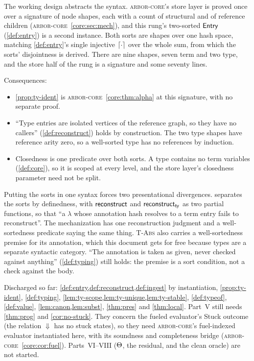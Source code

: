 \documentclass[11pt]{article}
\theoremstyle{definition}
\theoremstyle{plain}
\theoremstyle{remark}
\newcommand{\arborcore}{\textsc{arbor-core}}
\newcommand{\coreref}[1]{\arborcore~\cref{core:#1}}
\begin{document}
The working design abstracts the syntax. \arborcore{}'s store layer is proved once over a
signature of node shapes, each with a count of structural and of reference children
(\coreref{sec:mech}), and this rung's two-sorted $\mathsf{Entry}$ (\cref{def:entry}) is a second
instance. Both sorts are shapes over one hash space, matching \cref{def:entry}'s single
injective $\lceil \cdot \rceil$ over the whole sum, from which the sorts' disjointness is derived.
There are nine shapes, seven term and two type, and the store half of the rung is a signature
and some seventy lines.

Consequences:
\begin{itemize}[nosep]
  \item \cref{prop:ty-ident} is \coreref{thm:alpha} at this signature, with no separate proof.
  \item ``Type entries are isolated vertices of the reference graph, so they have no callers''
  (\cref{def:reconstruct}) holds by construction. The two type shapes have reference arity
  zero, so a well-sorted type has no references by induction.
  \item Closedness is one predicate over both sorts. A type contains no term variables
  (\cref{def:core}), so it is scoped at every level, and the store layer's closedness parameter
  need not be split.
\end{itemize}

Putting the sorts in one syntax forces two presentational divergences.
 separates the sorts by definedness, with $\mathsf{reconstruct}$ and
$\mathsf{reconstruct}_{\mathsf{ty}}$ as two partial functions, so that ``a $\lambda$ whose annotation hash
resolves to a term entry fails to reconstruct''. The mechanization has one reconstruction
judgment and a well-sortedness predicate saying the same thing. \textsc{T-Abs} also carries a
well-sortedness premise for its annotation, which this document gets for free because types
are a separate syntactic category. ``The annotation is taken as given, never checked against
anything'' (\cref{def:typing}) still holds: the premise is a sort condition, not a check
against the body.

Discharged so far: \cref{def:entry,def:reconstruct,def:ingest} by instantiation,
\cref{prop:ty-ident}, \cref{def:typing}, \cref{lem:ty-scope,lem:ty-unique,lem:ty-stable},
\cref{def:typeof}, \cref{def:value}, \cref{lem:canon,lem:subst}, \cref{thm:pres} and
\cref{thm:local}. Part~V still needs \cref{thm:prog} and \cref{cor:no-stuck}. They concern the
fueled evaluator's \textsf{Stuck} outcome (the relation $\Downarrow$ has no stuck states), so
they need \arborcore{}'s fuel-indexed evaluator instantiated here, with its soundness and
completeness bridge (\coreref{cor:fuel}). Parts~VI--VIII ($\Theta$, the residual, and the clean
oracle) are not started.
\end{document}
